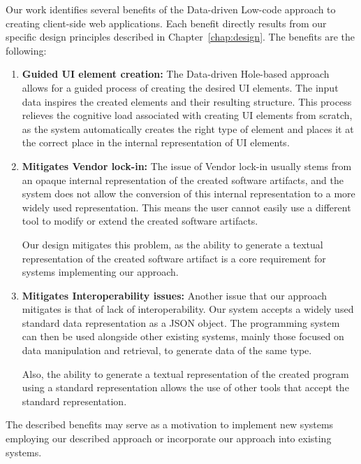 Our work identifies several benefits of the Data-driven Low-code approach to creating client-side web applications.
Each benefit directly results from our specific design principles described in Chapter~\ref{chap:design}.
The benefits are the following:
\begin{enumerate}
	\item \textbf{Guided UI element creation:} The Data-driven Hole-based approach allows for a guided process of creating the desired UI elements.
	      The input data inspires the created elements and their resulting structure.
	      This process relieves the cognitive load associated with creating UI elements from scratch, as the system automatically creates the right type
	      of element and places it at the correct place in the internal representation of UI elements.

	\item \textbf{Mitigates Vendor lock-in:} The issue of Vendor lock-in usually stems from an opaque internal representation of the created software artifacts,
	      and the system does not allow the conversion of this internal representation to a more widely used representation.
	      This means the user cannot easily use a different tool to modify or extend the created software artifacts.

	      Our design mitigates this problem, as the ability to generate a textual representation of the created software artifact is a core requirement
	      for systems implementing our approach.
	\item \textbf{Mitigates Interoperability issues:} Another issue that our approach mitigates is that of lack of interoperability.
	      Our system accepts a widely used standard data representation as a JSON object.
	      The programming system can then be used alongside other existing systems, mainly those focused on data manipulation and retrieval, to generate data of the same type.

	      Also, the ability to generate a textual representation of the created program using a standard representation allows the use of other tools that accept the standard representation.
\end{enumerate}

The described benefits may serve as a motivation to implement new systems employing our described approach or incorporate our approach into existing systems.

